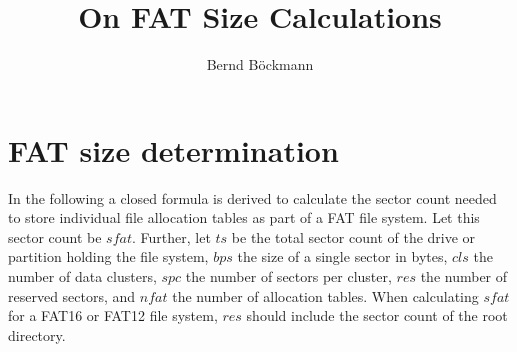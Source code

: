 \documentclass[12pt]{scrartcl}
\title{On FAT Size Calculations}
\author{Bernd Böckmann}
\begin{document}
\maketitle
\tableofcontents

\section{FAT size determination}
In the following a closed formula is derived to calculate the sector count needed to store individual file allocation tables as part of a FAT file system. Let this sector count be $sfat$. Further, let $ts$ be the total sector count of the drive or partition holding the file system, $bps$ the size of a single sector in bytes, $cls$ the number of data clusters, $spc$ the number of sectors per cluster, $res$ the number of reserved sectors, and $nfat$ the number of allocation tables. When calculating $sfat$ for a FAT16 or FAT12 file system, $res$ should include the sector count of the root directory.
\end{document}
